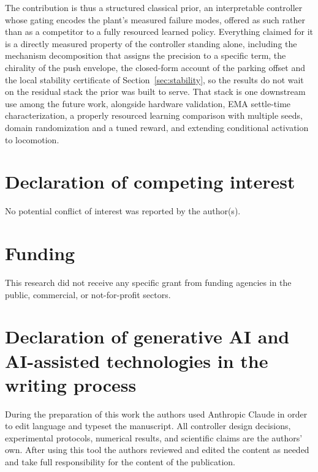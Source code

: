 \documentclass[a4paper,fleqn]{cas-dc}
\begin{document}
The contribution is thus a structured classical prior, an interpretable
controller whose gating encodes the plant's measured failure modes, offered as
such rather than as a competitor to a fully resourced learned policy. Everything
claimed for it is a directly measured property of the controller standing alone,
including the mechanism decomposition that assigns the precision to a specific
term, the chirality of the push envelope, the closed-form account of the parking
offset and the local stability certificate of Section~\ref{sec:stability}, so
the results do not wait on the residual stack the prior was built to serve. That
stack is one downstream use among the future work, alongside hardware
validation, EMA settle-time characterization, a properly resourced learning
comparison with multiple seeds, domain randomization and a tuned reward, and
extending conditional activation to locomotion.

\section*{Declaration of competing interest}
No potential conflict of interest was reported by the author(s).

\section*{Funding}
This research did not receive any specific grant from funding agencies in the
public, commercial, or not-for-profit sectors.

\section*{Declaration of generative AI and AI-assisted technologies in the writing process}
During the preparation of this work the authors used Anthropic Claude in order to
edit language and typeset the manuscript. All controller design decisions,
experimental protocols, numerical results, and scientific claims are the
authors' own. After using this tool the authors reviewed and edited the content
as needed and take full responsibility for the content of the publication.
\end{document}
